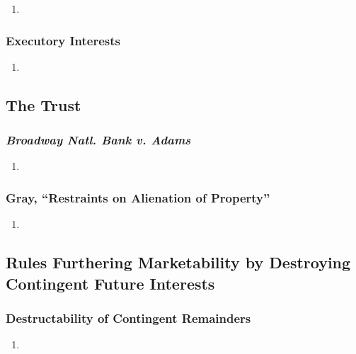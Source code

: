 \begin{enumerate}
    \item %
\end{enumerate}

\subsubsection{Executory Interests}

\begin{enumerate}
    \item %
\end{enumerate}

\subsection{The Trust}

\subsubsection{\emph{Broadway Natl. Bank v. Adams}}

\begin{enumerate}
    \item %
\end{enumerate}

\subsubsection{Gray, ``Restraints on Alienation of Property''}

\begin{enumerate}
    \item %
\end{enumerate}

\subsection{Rules Furthering Marketability by Destroying Contingent Future 
Interests}

\subsubsection{Destructability of Contingent Remainders}

\begin{enumerate}
    \item %
\end{enumerate}

